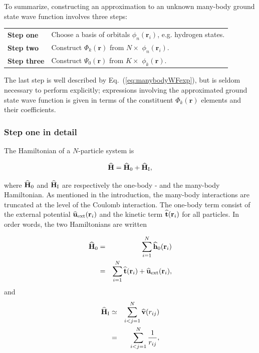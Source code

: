 To summarize, constructing an approximation to an unknown many-body ground state wave function involves three steps:

\begin{center}
\begin{tabular}{l|l}
 \textbf{Step one}   &  Choose a basis of orbitals $\phi_n(\mathbf{r}_i)$, e.g. hydrogen states. \\
 \textbf{Step two}   &  Construct $\Phi_k(\mathbf{r})$ from $N\times$ $\phi_n(\mathbf{r}_i)$.   \\
 \textbf{Step three} &  Construct $\Psi_0(\mathbf{r})$ from $K\times$ $\phi_k(\mathbf{r})$.     \\
\end{tabular}
\end{center}

The last step is well described by Eq.~(\ref{eq:manybodyWFexp}), but is seldom necessary to perform explicitly; expressions involving the approximated ground state wave function is given in terms of the constituent $\Phi_k(\mathbf{r})$ elements and their coefficients.

\subsubsection{Step one in detail}

The Hamiltonian of a $N$-particle system is 

\begin{equation}
 {\bf\widehat{H}} = {\bf\widehat{H}}_0 + {\bf\widehat{H}}_\mathrm{I},
\end{equation}

where ${\bf\widehat{H}}_0$ and ${\bf\widehat{H}}_\mathrm{I}$ are respectively the one-body - and the many-body Hamiltonian. As mentioned in the introduction, the many-body interactions are truncated at the level of the Coulomb interaction. The one-body term consist of the external potential ${\bf\widehat{u}}_\mathrm{ext}(\mathbf{r}_i)$ and the kinetic term ${\bf\widehat{t}}(\mathbf{r}_i)$ for all particles. In order words, the two Hamiltonians are written

\begin{eqnarray}
 {\bf\widehat{H}}_0 &=& \sum_{i=1}^N {\bf\widehat{h}}_0(\mathbf{r}_i) \\
          &=& \sum_{i=1}^N {\bf\widehat{t}}(\mathbf{r}_i) + {\bf\widehat{u}}_\mathrm{ext}(\mathbf{r}_i), \nonumber
  \end{eqnarray}
  and
\begin{eqnarray}
 {\bf\widehat{H}}_\mathrm{I} &\simeq& \sum_{i<j=1}^N {\bf\widehat{v}}(r_{ij}) \\
          &=& \sum_{i<j=1}^N \frac{1}{r_{ij}},  \nonumber
\end{eqnarray}

